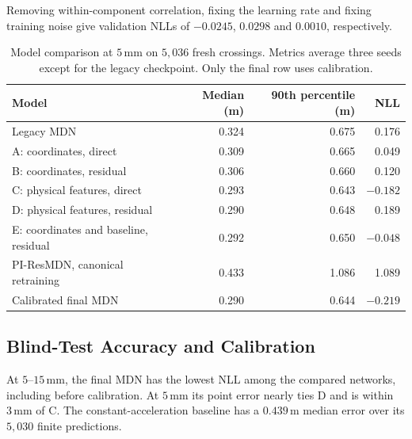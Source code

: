 \documentclass[11pt,a4paper]{article}
\begin{document}
Removing within-component correlation, fixing the learning rate and fixing training noise give validation NLLs of $-0.0245$, $0.0298$ and $0.0010$, respectively.

\begin{table}[htbp]
  \centering
  \caption{Model comparison at $5\,\mathrm{mm}$ on $5{,}036$ fresh crossings. Metrics average three seeds except for the legacy checkpoint. Only the final row uses calibration.}
  \label{tab:modelcomparison}
  \begin{tabular}{lrrr}
    \toprule
    Model & Median (m) & 90th percentile (m) & NLL \\
    \midrule
    Legacy MDN & 0.324 & 0.675 & 0.176 \\
    A: coordinates, direct & 0.309 & 0.665 & 0.049 \\
    B: coordinates, residual & 0.306 & 0.660 & 0.120 \\
    C: physical features, direct & 0.293 & 0.643 & $-0.182$ \\
    D: physical features, residual & 0.290 & 0.648 & 0.189 \\
    E: coordinates and baseline, residual & 0.292 & 0.650 & $-0.048$ \\
    PI-ResMDN, canonical retraining & 0.433 & 1.086 & 1.089 \\
    Calibrated final MDN & 0.290 & 0.644 & $\mathbf{-0.219}$ \\
    \bottomrule
  \end{tabular}
\end{table}

\subsection{Blind-Test Accuracy and Calibration}
\label{sec:blind}

At $5$--$15\,\mathrm{mm}$, the final MDN has the lowest NLL among the compared networks, including before calibration. At $5\,\mathrm{mm}$ its point error nearly ties D and is within $3\,\mathrm{mm}$ of C. The constant-acceleration baseline has a $0.439\,\mathrm{m}$ median error over its $5{,}030$ finite predictions.

\begin{table}[htbp]
  \centering
  \small
  \caption{Final MDN on $5{,}036$ independently simulated crossings, averaged over three seeds. Area and NLL are post-calibration.}
  \label{tab:holdout}
  
\end{table}
\end{document}
